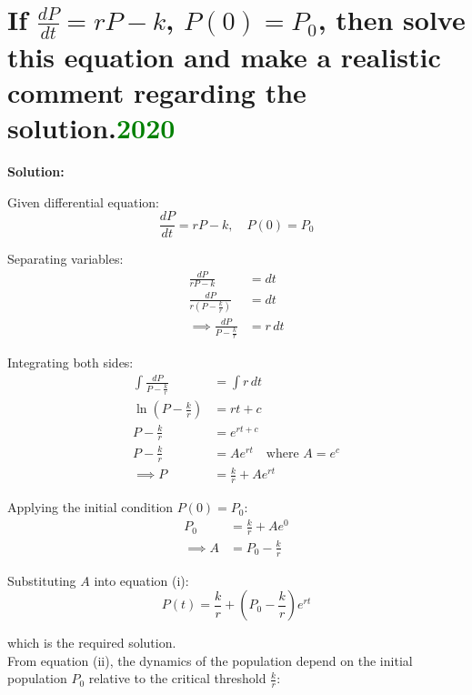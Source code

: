 \section{If $\frac{dP}{dt} = rP - k$, $P(0) = P_0$, then solve this equation and make a realistic comment regarding the solution.\textcolor{green}{2020}}
\textbf{Solution:}

Given differential equation:
\begin{equation*}
    \frac{dP}{dt} = rP - k, \quad P(0) = P_0
\end{equation*}

Separating variables:
\begin{align*}
    \frac{dP}{rP - k} &= dt \\[1ex]
    \frac{dP}{r\left(P - \frac{k}{r}\right)} &= dt \\[1ex]
    \implies \frac{dP}{P - \frac{k}{r}} &= r \, dt
\end{align*}

Integrating both sides:
\begin{align*}
    \int \frac{dP}{P - \frac{k}{r}} &= \int r \, dt \\[1ex]
    \ln\left(P - \frac{k}{r}\right) &= rt + c \\[1ex]
    P - \frac{k}{r} &= e^{rt + c} \\[1ex]
    P - \frac{k}{r} &= A e^{rt} \quad \text{where } A = e^c \\[1ex]
    \implies P &= \frac{k}{r} + A e^{rt} \tag{i}
\end{align*}

Applying the initial condition $P(0) = P_0$:
\begin{align*}
    P_0 &= \frac{k}{r} + A e^0 \\[1ex]
    \implies A &= P_0 - \frac{k}{r}
\end{align*}

Substituting $A$ into equation (i):
\begin{equation}
    P(t) = \frac{k}{r} + \left(P_0 - \frac{k}{r}\right)e^{rt} \tag{ii}
\end{equation}

which is the required solution.\\

From equation (ii), the dynamics of the population depend on the initial population $P_0$ relative to the critical threshold $\frac{k}{r}$:


